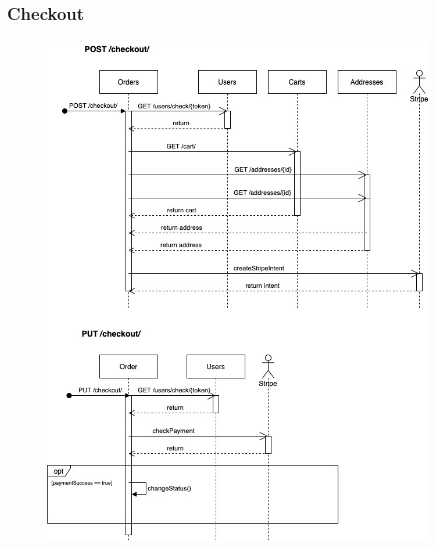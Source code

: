 \subsubsection{Checkout}
\begin{figure}[H]
    \includegraphics[width=0.9\textwidth]{res/images/sequence-diagrams/checkout.jpg}
\end{figure}

